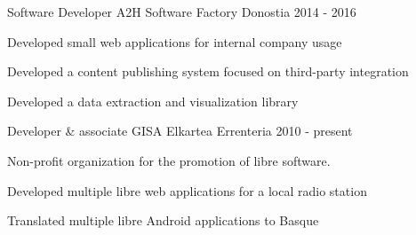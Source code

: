 \documentclass[11pt, a4paper]{awesome-cv}
\begin{document}
\begin{cventries}
    \cventry
      {Software Developer} %
      {A2H Software Factory} %
      {Donostia} %
      {2014 - 2016} %
      {
        \begin{cvitems} %
          \item {Developed small web applications for internal company usage}
          \item {Developed a content publishing system focused on third-party
              integration}
          \item {Developed a data extraction and visualization library}
        \end{cvitems}
      }

    \cventry
      {Developer \& associate} %
      {GISA Elkartea}
      {Errenteria} %
      {2010 - present} %
      {
        Non-profit organization for the promotion of libre
        software.\vspace{1.1\baselineskip}
        \begin{cvitems} %
          \item {Developed multiple libre web applications for a local radio
              station}
          \item {Translated multiple libre Android applications to Basque}
        \end{cvitems}
      }

\end{cventries}

\end{document}
